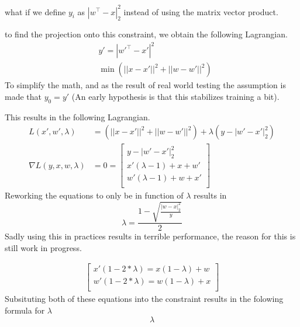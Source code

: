 what if we define $y_i$ as $|w^\top - x|^2_2$ instead of using the matrix vector product.

to find the projection onto this constraint, we obtain the following Lagrangian.
\begin{equation}
    \begin{split}
        &y'=|w'^\top - x'|^2\\
        &\min( ||x-x'||^2 + ||w-w'||^2)
    \end{split}
\end{equation}
To simplify the math, and as the result of real world testing the assumption is made that $y_0=y'$ (An early hypothesis is that this stabilizes training a bit).

This results in the following Lagrangian.
\begin{equation}
    \begin{split}
        L\left(x',w',\lambda\right) &= \left(||x-x'||^2 + ||w-w'||^2\right) +\lambda\left(y-|w' - x'|^2_2\right) \\
        \nabla L\left(y,x,w,\lambda\right) &=  0=
    \begin{bmatrix}
        y-|w' - x'|^2_2\\
        x'(\lambda -1) + x + w'\\
        w'(\lambda -1) + w + x'\\
    \end{bmatrix}
    \end{split}
\end{equation}
Reworking the equations to only be in function of $\lambda$ results in 
\begin{equation}
    \lambda = \frac{1-\sqrt{\frac{|w-x|^2_2}{y}} }{2}
\end{equation}
Sadly using this in practices results in terrible performance, the reason for this is still work in progress. 


\begin{equation}
    \begin{split}
    \begin{bmatrix}
        x'(1 - 2*\lambda) = x(1-\lambda) + w\\
        w'(1 - 2*\lambda) = w(1-\lambda) + x\\
    \end{bmatrix}
    \end{split}
\end{equation}
Subsituting both of these equations into the constraint results in the folowing formula for $\lambda$
\begin{equation}
    \lambda
\end{equation}

